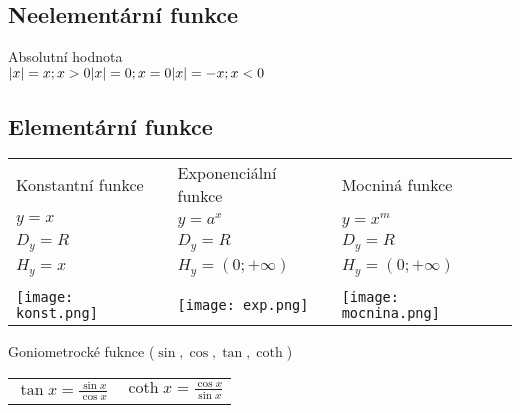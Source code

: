 \subsection*{Neelementární funkce}
Absolutní hodnota \\
\(
    \lvert x\rvert = x ; x > 0 \\
    \lvert x\rvert = 0 ; x = 0 \\
    \lvert x\rvert = -x ; x < 0
\)
    \subsection*{Elementární funkce}
\begin{tabular}{p{6cm} p{6cm} p{6cm}}
    Konstantní funkce & Exponenciální funkce & Mocniná funkce \\
    $y = x$ & $y = a^x$ & $y = x^m$ \\
    $D_y=R$ & $D_y = R$ & $D_y = R$ \\
    $H_y = {x}$ & $H_y = (0;+\infty)$ & $H_y = (0;+\infty)$ \\ \\
    \texttt{[image: konst.png]}&
    \texttt{[image: exp.png]}&
    \texttt{[image: mocnina.png]} \\

\end{tabular}

Goniometrocké fuknce
($\sin{},\cos{},\tan{}, \coth{}$)
 
\begin{center}
    \begin{tabular}{p{5cm} p{5cm}}
        \(\tan{x}=\frac{\sin{x}}{\cos{x}} \)&
        \(\coth{x}=\frac{\cos{x}}{\sin{x}} \) \\
    \end{tabular}
\end{center}
